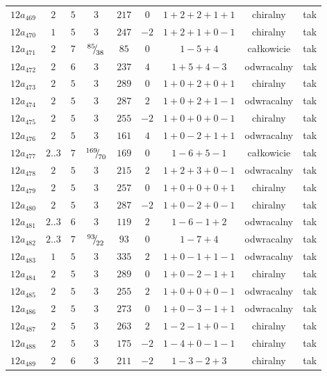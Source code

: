 \begin{longtable}{ccccccccc}
$12a_{469}$ & $2$ & $5$ & $3$ & $217$ & $0$ & $1+2+2+1+1$ & chiralny & tak \\
$12a_{470}$ & $1$ & $5$ & $3$ & $247$ & $-2$ & $1+2+1+0-1$ & chiralny & tak \\
$12a_{471}$ & $2$ & $7$ & ${}^{85}{\mskip -5mu/\mskip -3mu}_{38}$ & $85$ & $0$ & $1-5+4$ & całkowicie & tak \\
$12a_{472}$ & $2$ & $6$ & $3$ & $237$ & $4$ & $1+5+4-3$ & odwracalny & tak \\
$12a_{473}$ & $2$ & $5$ & $3$ & $289$ & $0$ & $1+0+2+0+1$ & chiralny & tak \\
$12a_{474}$ & $2$ & $5$ & $3$ & $287$ & $2$ & $1+0+2+1-1$ & odwracalny & tak \\
$12a_{475}$ & $2$ & $5$ & $3$ & $255$ & $-2$ & $1+0+0+0-1$ & chiralny & tak \\
$12a_{476}$ & $2$ & $5$ & $3$ & $161$ & $4$ & $1+0-2+1+1$ & odwracalny & tak \\
$12a_{477}$ & $2..3$ & $7$ & ${}^{169}{\mskip -5mu/\mskip -3mu}_{70}$ & $169$ & $0$ & $1-6+5-1$ & całkowicie & tak \\
$12a_{478}$ & $2$ & $5$ & $3$ & $215$ & $2$ & $1+2+3+0-1$ & odwracalny & tak \\
$12a_{479}$ & $2$ & $5$ & $3$ & $257$ & $0$ & $1+0+0+0+1$ & chiralny & tak \\
$12a_{480}$ & $2$ & $5$ & $3$ & $287$ & $-2$ & $1+0-2+0-1$ & chiralny & tak \\
$12a_{481}$ & $2..3$ & $6$ & $3$ & $119$ & $2$ & $1-6-1+2$ & odwracalny & tak \\
$12a_{482}$ & $2..3$ & $7$ & ${}^{93}{\mskip -5mu/\mskip -3mu}_{22}$ & $93$ & $0$ & $1-7+4$ & odwracalny & tak \\
$12a_{483}$ & $1$ & $5$ & $3$ & $335$ & $2$ & $1+0-1+1-1$ & odwracalny & tak \\
$12a_{484}$ & $2$ & $5$ & $3$ & $289$ & $0$ & $1+0-2-1+1$ & chiralny & tak \\
$12a_{485}$ & $2$ & $5$ & $3$ & $255$ & $2$ & $1+0+0+0-1$ & odwracalny & tak \\
$12a_{486}$ & $2$ & $5$ & $3$ & $273$ & $0$ & $1+0-3-1+1$ & odwracalny & tak \\
$12a_{487}$ & $2$ & $5$ & $3$ & $263$ & $2$ & $1-2-1+0-1$ & chiralny & tak \\
$12a_{488}$ & $2$ & $5$ & $3$ & $175$ & $-2$ & $1-4+0-1-1$ & chiralny & tak \\
$12a_{489}$ & $2$ & $6$ & $3$ & $211$ & $-2$ & $1-3-2+3$ & chiralny & tak \\

\end{longtable}
